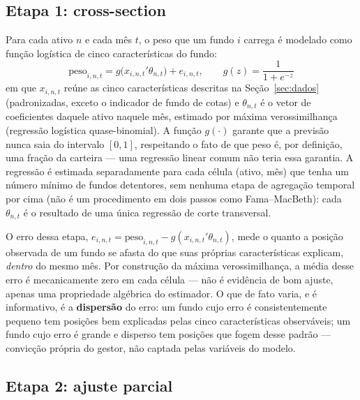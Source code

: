 \documentclass[11pt,a4paper]{article}
\begin{document}
\FloatBarrier
\subsection{Etapa 1: cross-section}

Para cada ativo $n$ e cada mês $t$, o peso que um fundo $i$ carrega é modelado como função
logística de cinco características do fundo:
\begin{equation}
\text{peso}_{i,n,t} = g\big(x_{i,n,t}'\theta_{n,t}\big) + e_{i,n,t}, \qquad
g(z) = \frac{1}{1+e^{-z}}
\label{eq:cs}
\end{equation}
em que $x_{i,n,t}$ reúne as cinco características descritas na Seção~\ref{sec:dados}
(padronizadas, exceto o indicador de fundo de cotas) e $\theta_{n,t}$ é o vetor de coeficientes
daquele ativo naquele mês, estimado por máxima verossimilhança (regressão logística
quase-binomial). A função $g(\cdot)$ garante que a previsão nunca saia do intervalo $[0,1]$,
respeitando o fato de que peso é, por definição, uma fração da carteira --- uma regressão linear
comum não teria essa garantia. A regressão é estimada separadamente para cada célula
(ativo, mês) que tenha um número mínimo de fundos detentores, sem nenhuma etapa de agregação
temporal por cima (não é um procedimento em dois passos como Fama--MacBeth): cada
$\theta_{n,t}$ é o resultado de uma única regressão de corte transversal.

O erro dessa etapa, $e_{i,n,t} = \text{peso}_{i,n,t} - g(x_{i,n,t}'\theta_{n,t})$, mede o quanto
a posição observada de um fundo se afasta do que suas próprias características explicam,
\emph{dentro} do mesmo mês. Por construção da máxima verossimilhança, a média desse erro é
mecanicamente zero em cada célula --- não é evidência de bom ajuste, apenas uma propriedade
algébrica do estimador. O que de fato varia, e é informativo, é a \textbf{dispersão} do erro: um
fundo cujo erro é consistentemente pequeno tem posições bem explicadas pelas cinco
características observáveis; um fundo cujo erro é grande e disperso tem posições que fogem
desse padrão --- convicção própria do gestor, não captada pelas variáveis do modelo.

\FloatBarrier
\subsection{Etapa 2: ajuste parcial}
\end{document}
